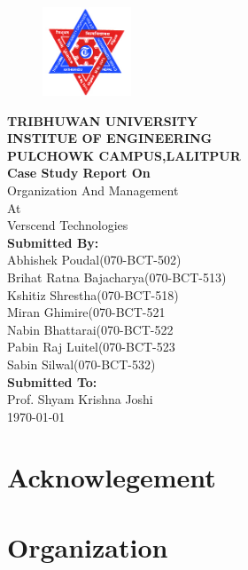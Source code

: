 \documentclass[12pt, a4paper]{article}
\begin{document}
	\begin{titlepage}
	\centering
	\begin{figure}[h!]
	\centering
	\includegraphics[width=100px]{fig/tu-logo.jpg}
	\end{figure}
	\vspace{10mm}
	{\large\textbf{TRIBHUWAN UNIVERSITY\\
	INSTITUE OF ENGINEERING\\
	PULCHOWK CAMPUS,LALITPUR\\}}
	\vspace{10mm}
	\textbf{ Case Study Report On}\\
	Organization And Management\\
	At\\
	Verscend Technologies\\
	\vspace{10mm}
	\textbf{Submitted By:}\\
	Abhishek Poudal(070-BCT-502)\\
	Brihat Ratna Bajacharya(070-BCT-513)\\
	Kshitiz Shrestha(070-BCT-518)\\
	Miran Ghimire(070-BCT-521\\
	Nabin Bhattarai(070-BCT-522\\
	Pabin Raj Luitel(070-BCT-523\\
	Sabin Silwal(070-BCT-532)\\
	\vspace{10mm}
	\textbf{Submitted To:}\\
	Prof. Shyam Krishna Joshi\\
	\vspace{10mm}
	\vfill
	\today
	\end{titlepage}
	\cleardoublepage

	\section*{Acknowlegement}
	\cleardoublepage

	\section{Organization}
\end{document}
